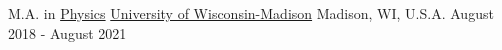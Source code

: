 \begin{cventries}
  \cventry
    {M.A. in \href{https://www.physics.wisc.edu/}{Physics}}
    {\href{https://www.wisc.edu/}{University of Wisconsin-Madison}}
    {Madison, WI, U.S.A.}
    {August 2018 - August 2021}
    {
      \begin{cvitems}

\end{cvitems}}
\end{cventries}
